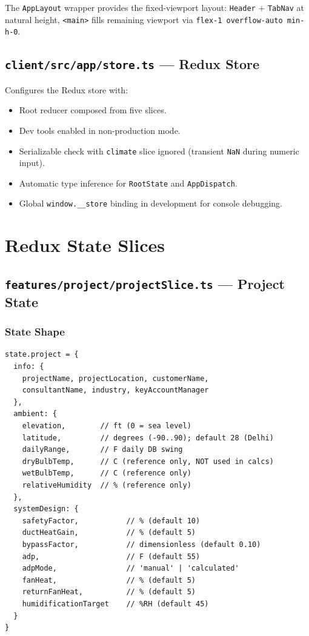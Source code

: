 \documentclass[12pt, a4paper, oneside]{report}
\newcommand{\file}[1]{\texttt{\textcolor{codeblue}{#1}}}
\newcommand{\code}[1]{\texttt{\textcolor{codered}{#1}}}
\begin{document}
The \code{AppLayout} wrapper provides the fixed-viewport layout: \code{Header} + \code{TabNav} at natural height, \code{<main>} fills remaining viewport via \code{flex-1 overflow-auto min-h-0}.

\section{\file{client/src/app/store.ts} --- Redux Store}

Configures the Redux store with:
\begin{itemize}
  \item Root reducer composed from five slices.
  \item Dev tools enabled in non-production mode.
  \item Serializable check with \code{climate} slice ignored (transient \code{NaN} during numeric input).
  \item Automatic type inference for \code{RootState} and \code{AppDispatch}.
  \item Global \code{window.\_\_store} binding in development for console debugging.
\end{itemize}


\chapter{Redux State Slices}

\section{\file{features/project/projectSlice.ts} --- Project State}

\subsection{State Shape}

\begin{lstlisting}[language={}, caption={Project State Shape}]
state.project = {
  info: {
    projectName, projectLocation, customerName,
    consultantName, industry, keyAccountManager
  },
  ambient: {
    elevation,        // ft (0 = sea level)
    latitude,         // degrees (-90..90); default 28 (Delhi)
    dailyRange,       // F daily DB swing
    dryBulbTemp,      // C (reference only, NOT used in calcs)
    wetBulbTemp,      // C (reference only)
    relativeHumidity  // % (reference only)
  },
  systemDesign: {
    safetyFactor,           // % (default 10)
    ductHeatGain,           // % (default 5)
    bypassFactor,           // dimensionless (default 0.10)
    adp,                    // F (default 55)
    adpMode,                // 'manual' | 'calculated'
    fanHeat,                // % (default 5)
    returnFanHeat,          // % (default 5)
    humidificationTarget    // %RH (default 45)
  }
}
\end{lstlisting}
\end{document}
